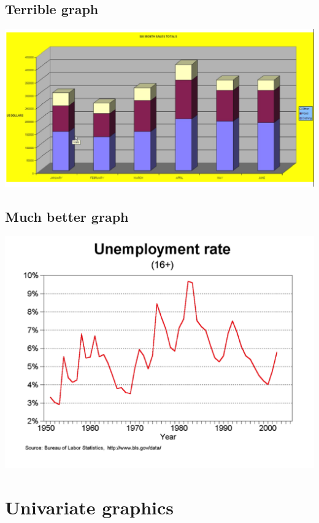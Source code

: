 \documentclass[
]{book}
\begin{document}
\hypertarget{terrible-graph}{%
\subsection{Terrible graph}\label{terrible-graph}}

\includegraphics{Stata/StataGraphics/images/Terrible.png}

\hypertarget{much-better-graph}{%
\subsection{Much better graph}\label{much-better-graph}}

\includegraphics{Stata/StataGraphics/images/Good.png}

\hypertarget{univariate-graphics}{%
\section{Univariate graphics}\label{univariate-graphics}}
\end{document}
